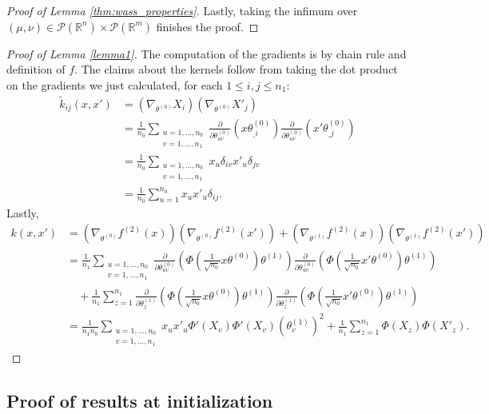 \documentclass{article}
\theoremstyle{definition}
\theoremstyle{remark}
\numberwithin{equation}{section}
\newcommand{\R}{\mathbb{R}}
\newcommand{\partv}[1]{
    \frac{\partial}{\partial #1}
}
\begin{document}
\begin{proof}[Proof of Lemma \ref{thm:wass_properties}]
Lastly, taking the infimum over $(\mu, \nu) \in \mathcal P(\R^n) \times \mathcal P(\R^m)$ finishes the proof.
\end{proof}

\begin{proof}[Proof of Lemma \ref{lemma1}]
    The computation of the gradients is by chain rule and definition of $f$.
    The claims about the kernels follow from taking the dot product on the gradients we just calculated, for each $1\le i,j \le n_1$:
    \begin{align}
        \tilde k_{ij}(x,x') &= \left(\nabla_{\theta^{(0)}}X_i\right)\left(\nabla_{\theta^{(0)}}X'_j\right) \\
        &=\frac{1}{n_0}\sum_{\substack{u=1, \ldots, n_0 \\v=1, \ldots, n_1}} \partv{\theta^{(0)}_{uv}}(x\theta^{(0)}_{\_ i})\partv{\theta^{(0)}_{uv}}(x'\theta^{(0)}_{\_ j}) \\
        &=\frac{1}{n_0}\sum_{\substack{u=1, \ldots, n_0 \\v=1, \ldots, n_1}} x_u\delta_{iv}x'_u\delta_{jv} \\
        &=\frac{1}{n_0}\sum_{u=1}^{n_0}x_ux'_u\delta_{ij}.
    \end{align}
    Lastly,
    \begin{align}
        k(x,x') &= \left(\nabla_{\theta^{(0)}}f^{(2)}(x)\right)\left(\nabla_{\theta^{(0)}}f^{(2)}(x')\right) + \left(\nabla_{\theta^{(1)}}f^{(2)}(x)\right)\left(\nabla_{\theta^{(1)}}f^{(2)}(x')\right) \\
        &=\frac{1}{n_1}\sum_{\substack{u=1, \ldots, n_0 \\v=1, \ldots, n_1}} \partv{\theta^{(0)}_{uv}}(\Phi(\frac{1}{\sqrt{n_0}}x\theta^{(0)})\theta^{(1)})\partv{\theta^{(0)}_{uv}}(\Phi(\frac{1}{\sqrt{n_0}}x'\theta^{(0)})\theta^{(1)}) \\
        &\quad + \frac{1}{n_1}\sum_{z=1}^{n_1} \partv{\theta^{(1)}_z}(\Phi(\frac{1}{\sqrt{n_0}}x\theta^{(0)})\theta^{(1)})\partv{\theta^{(1)}_z}(\Phi(\frac{1}{\sqrt{n_0}}x'\theta^{(0)})\theta^{(1)}) \\
        &=\frac{1}{n_1n_0}\sum_{\substack{u=1, \ldots, n_0 \\v=1, \ldots, n_1}} x_ux'_u\Phi'(X_v)\Phi'(X_v)(\theta^{(1)}_v)^2 + \frac{1}{n_1}\sum_{z=1}^{n_1}\Phi(X_z)\Phi(X'_z).
    \end{align}
\end{proof}
    
\subsection{Proof of results at initialization}
\end{document}
